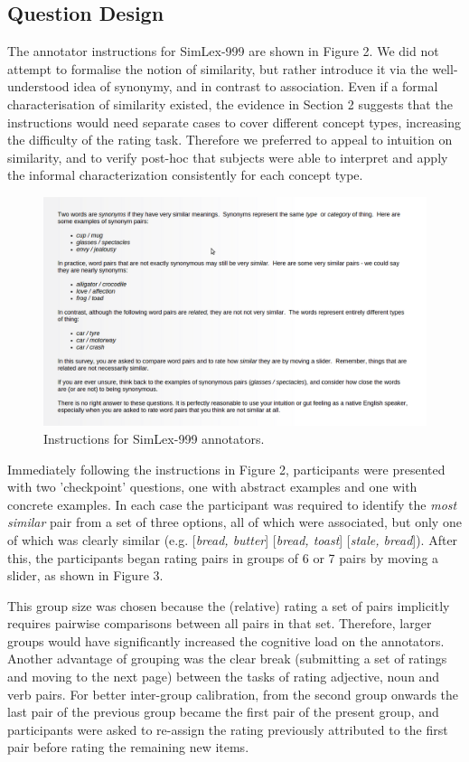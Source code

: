 \documentclass[fullname]{clv2}
\begin{document}
\subsection{Question Design}

The annotator instructions for SimLex-999 are shown in Figure 2. We did not attempt to formalise the notion of similarity, but rather introduce it via the well-understood idea of synonymy, and in contrast to association. Even if a formal characterisation of similarity existed, the evidence in Section 2 suggests that the instructions would need separate cases to cover different concept types, increasing the difficulty of the rating task. Therefore we preferred to appeal to intuition on similarity, and to verify post-hoc that subjects were able to interpret and apply the informal characterization consistently for each concept type. 

\begin{figure}[ht]  \includegraphics[width = \textwidth]{screenshot1_CL}  \caption{Instructions for SimLex-999 annotators.}\end{figure} 

Immediately following the instructions in Figure 2, participants were presented with two 'checkpoint' questions, one with abstract examples and one with concrete examples. In each case the participant was required to identify the \emph{most similar} pair from a set of three options, all of which were associated, but only one of which was clearly similar (e.g. [\emph{bread, butter}] [\emph{bread, toast}] [\emph{stale, bread}]). After this, the participants began rating pairs in groups of 6 or 7 pairs by moving a slider, as shown in Figure 3.

This group size was chosen because the (relative) rating a set of pairs implicitly requires pairwise comparisons between all pairs in that set. Therefore, larger groups would have significantly increased the cognitive load on the annotators. Another advantage of grouping was the clear break (submitting a set of ratings and moving to the next page) between the tasks of rating adjective, noun and verb pairs. For better inter-group calibration, from the second group onwards the last pair of the previous group became the first pair of the present group, and participants were asked to re-assign the rating previously attributed to the first pair before rating the remaining new items.  
\end{document}

